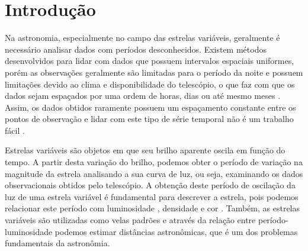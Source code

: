 \chapter{Introdu\c{c}ão}


Na astronomia, especialmente no campo das estrelas variáveis, geralmente é necessário analisar dados com períodos desconhecidos. Existem métodos desenvolvidos para lidar com dados que possuem intervalos espaciais uniformes, porém as observações geralmente são limitadas para o período da noite e possuem limitações devido ao clima e disponibilidade do telescópio, o que faz com que os dados sejam espaçados por uma ordem de horas, dias ou até mesmo meses \citep{mello81}. 
Assim, os dados obtidos raramente possuem um espaçamento constante entre os pontos de observação e lidar com este tipo de série temporal não é um trabalho fácil \citep{lomb}.


Estrelas variáveis são objetos em que seu brilho aparente oscila em função do tempo. A partir desta variação do brilho, podemos obter o período de variação na magnitude da estrela analisando a sua curva de luz, ou seja, examinando os dados observacionais obtidos pelo telescópio. A obtenção deste período de oscilação da luz de uma estrela variável é fundamental para descrever a estrela, pois podemos relacionar este período com luminosidade \citep{Leavitt1912}, densidade \citep{Payne1930} e cor \citep{Kraft1960}. Também, as estrelas variáveis são utilizadas como velas padrões e através da relação entre período-luminosidade podemos estimar distâncias astronômicas, que é um dos problemas fundamentais da astronômia.



